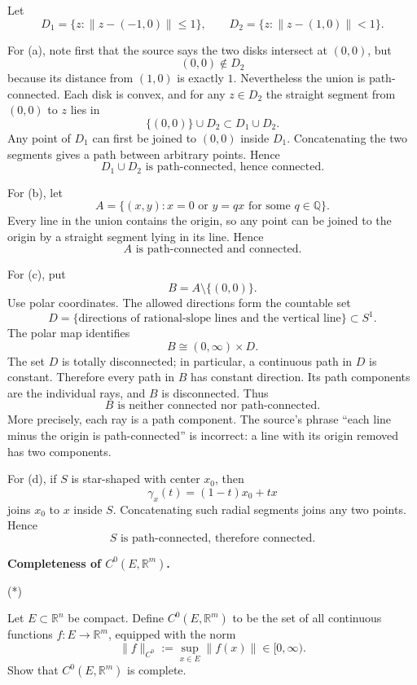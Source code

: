 \begin{solution}
Let
\[
D_1=\{z:\|z-(-1,0)\|\le1\},
\qquad
D_2=\{z:\|z-(1,0)\|<1\}.
\]

For (a), note first that the source says the two disks intersect at \((0,0)\), but
\[
(0,0)\notin D_2
\]
because its distance from \((1,0)\) is exactly \(1\). Nevertheless the union is
path-connected. Each disk is convex, and for any \(z\in D_2\) the straight segment from
\((0,0)\) to \(z\) lies in
\[
\{(0,0)\}\cup D_2\subset D_1\cup D_2.
\]
Any point of \(D_1\) can first be joined to \((0,0)\) inside \(D_1\). Concatenating the two
segments gives a path between arbitrary points. Hence
\[
\boxed{D_1\cup D_2\text{ is path-connected, hence connected}.}
\]

For (b), let
\[
A=\{(x,y):x=0\text{ or }y=qx\text{ for some }q\in\mathbb Q\}.
\]
Every line in the union contains the origin, so any point can be joined to the origin by a
straight segment lying in its line. Hence
\[
\boxed{A\text{ is path-connected and connected}.}
\]

For (c), put
\[
B=A\setminus\{(0,0)\}.
\]
Use polar coordinates. The allowed directions form the countable set
\[
D=
\{\text{directions of rational-slope lines and the vertical line}\}
\subset S^1.
\]
The polar map identifies
\[
B\cong(0,\infty)\times D.
\]
The set \(D\) is totally disconnected; in particular, a continuous path in \(D\) is
constant. Therefore every path in \(B\) has constant direction. Its path components are
the individual rays, and \(B\) is disconnected. Thus
\[
\boxed{B\text{ is neither connected nor path-connected}.}
\]
More precisely, each ray is a path component. The source's phrase ``each line minus the
origin is path-connected'' is incorrect: a line with its origin removed has two components.

For (d), if \(S\) is star-shaped with center \(x_0\), then
\[
\gamma_x(t)=(1-t)x_0+tx
\]
joins \(x_0\) to \(x\) inside \(S\). Concatenating such radial segments joins any two
points. Hence
\[
\boxed{S\text{ is path-connected, therefore connected}.}
\]
\end{solution}


\begin{problem}[CP-II-0520]
\label{prob:cp-ii-0520}
\textbf{Completeness of \(C^0(E,\mathbb R^m)\).}

\hspace*{1.5em}(*)

Let $E\subset\mathbb{R}^n$ be compact. Define $C^0(E,\mathbb{R}^m)$ to be the set of all continuous
functions $f:E\to\mathbb{R}^m$, equipped with the norm
\[
\|f\|_{C^0}:=\sup_{x\in E}\|f(x)\| \in [0,\infty).
\]
Show that $C^0(E,\mathbb{R}^m)$ is complete.
\end{problem}

